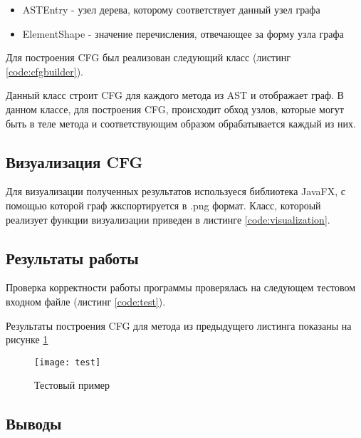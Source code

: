 \begin{itemize}
\item ASTEntry - узел дерева, которому соответствует данный узел графа
\item ElementShape - значение перечисления, отвечающее за форму узла графа
\end{itemize}

Для построения CFG был реализован следующий класс (листинг \ref{code:cfgbuilder}).


\parindent=1cm

Данный класс строит CFG для каждого метода из AST и отображает граф. В данном классе, для построения CFG, происходит обход узлов, которые могут быть в теле метода и соответствующим образом обрабатывается каждый из них.

\subsection{Визуализация CFG}

Для визуализации полученных результатов используеся библиотека JavaFX, с помощью которой граф жкспортируется в .png формат. Класс, котороый реализует функции визуализации приведен в листинге \ref{code:visualization}.


\parindent=1cm

\subsection{Результаты работы}

Проверка корректности работы программы проверялась на следующем тестовом входном файле (листинг \ref{code:test}).


\parindent=1cm

\newpage
Результаты построения CFG для метода из предыдущего листинга показаны на рисунке \ref{pic:test}
\begin{figure}[H]
	\begin{center}
		\texttt{[image: test]}
		\caption{Тестовый пример} 
		\label{pic:test} %
	\end{center}
\end{figure}

\newpage
\subsection{Выводы}


